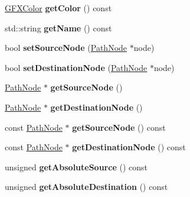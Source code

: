 \begin{DoxyCompactItemize}
\item 
\hyperlink{structGFXColor}{G\+F\+X\+Color} {\bfseries get\+Color} () const \hypertarget{classNavPath_a02b0f2de6ffc34646b05bdb8e1594431}{}\label{classNavPath_a02b0f2de6ffc34646b05bdb8e1594431}

\item 
std\+::string {\bfseries get\+Name} () const \hypertarget{classNavPath_a2499e4cda1620fc0e9e71d1b566f31b8}{}\label{classNavPath_a2499e4cda1620fc0e9e71d1b566f31b8}

\item 
bool {\bfseries set\+Source\+Node} (\hyperlink{classPathNode}{Path\+Node} $\ast$node)\hypertarget{classNavPath_a2109e531b34ba425f321646d2d657669}{}\label{classNavPath_a2109e531b34ba425f321646d2d657669}

\item 
bool {\bfseries set\+Destination\+Node} (\hyperlink{classPathNode}{Path\+Node} $\ast$node)\hypertarget{classNavPath_a0a284c0c7db854eda0af8017fdb6746d}{}\label{classNavPath_a0a284c0c7db854eda0af8017fdb6746d}

\item 
\hyperlink{classPathNode}{Path\+Node} $\ast$ {\bfseries get\+Source\+Node} ()\hypertarget{classNavPath_ac4acb59d92ec447a77a0e650af19aece}{}\label{classNavPath_ac4acb59d92ec447a77a0e650af19aece}

\item 
\hyperlink{classPathNode}{Path\+Node} $\ast$ {\bfseries get\+Destination\+Node} ()\hypertarget{classNavPath_a86ee41d99826615beddbfbd830a9659d}{}\label{classNavPath_a86ee41d99826615beddbfbd830a9659d}

\item 
const \hyperlink{classPathNode}{Path\+Node} $\ast$ {\bfseries get\+Source\+Node} () const \hypertarget{classNavPath_a68d01840244ca442d574f81e3a3ebeff}{}\label{classNavPath_a68d01840244ca442d574f81e3a3ebeff}

\item 
const \hyperlink{classPathNode}{Path\+Node} $\ast$ {\bfseries get\+Destination\+Node} () const \hypertarget{classNavPath_a9e8dd250e0d5c739d5b4343be7c4368f}{}\label{classNavPath_a9e8dd250e0d5c739d5b4343be7c4368f}

\item 
unsigned {\bfseries get\+Absolute\+Source} () const \hypertarget{classNavPath_a952b510f076d40649b4cd8807a89a1df}{}\label{classNavPath_a952b510f076d40649b4cd8807a89a1df}

\item 
unsigned {\bfseries get\+Absolute\+Destination} () const \hypertarget{classNavPath_afe8c6f05de51430516210ff8a9cc10f8}{}\label{classNavPath_afe8c6f05de51430516210ff8a9cc10f8}


\end{DoxyCompactItemize}
